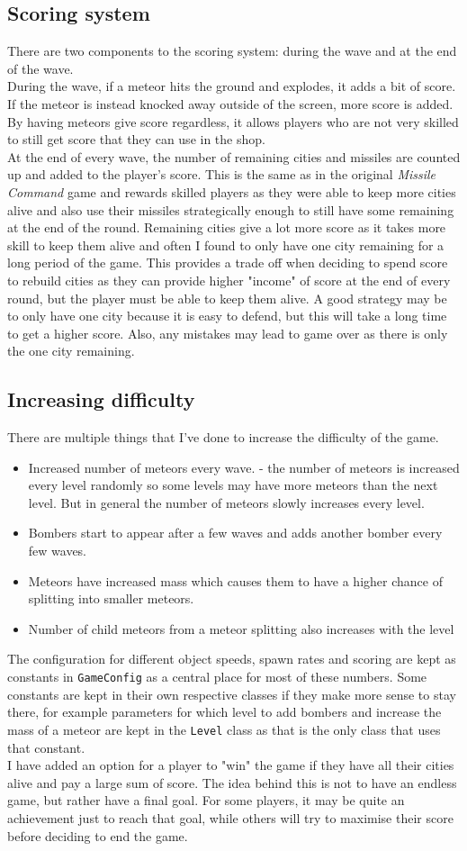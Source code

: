 \documentclass{article}
\newcommand{\n}[0]{\\[\baselineskip]}
\begin{document}
\subsection{Scoring system}
There are two components to the scoring system: during the wave and at the end of the wave. \n
During the wave, if a meteor hits the ground and explodes, it adds a bit of score. If the meteor is instead knocked away outside of the screen, more score is added. By having meteors give score regardless, it allows players who are not very skilled to still get score that they can use in the shop.
\n
At the end of every wave, the number of remaining cities and missiles are counted up and added to the player's score. This is the same as in the original \textit{Missile Command} game and rewards skilled players as they were able to keep more cities alive and also use their missiles strategically enough to still have some remaining at the end of the round. Remaining cities give a lot more score as it takes more skill to keep them alive and often I found to only have one city remaining for a long period of the game. This provides a trade off when deciding to spend score to rebuild cities as they can provide higher "income" of score at the end of every round, but the player must be able to keep them alive. A good strategy may be to only have one city because it is easy to defend, but this will take a long time to get a higher score. Also, any mistakes may lead to game over as there is only the one city remaining. 
\subsection{Increasing difficulty}
There are multiple things that I've done to increase the difficulty of the game. 
\begin{itemize}
\item Increased number of meteors every wave. - the number of meteors is increased every level randomly so some levels may have more meteors than the next level. But in general the number of meteors slowly increases every level. 
\item Bombers start to appear after a few waves and adds another bomber every few waves.
\item Meteors have increased mass which causes them to have a higher chance of splitting into smaller meteors.
\item Number of child meteors from a meteor splitting also increases with the level
\end{itemize}
The configuration for different object speeds, spawn rates and scoring are kept as constants in \texttt{GameConfig} as a central place for most of these numbers. Some constants are kept in their own respective classes if they make more sense to stay there, for example parameters for which level to add bombers and increase the mass of a meteor are kept in the \texttt{Level} class as that is the only class that uses that constant.
\n
I have added an option for a player to "win" the game if they have all their cities alive and pay a large sum of score. The idea behind this is not to have an endless game, but rather have a final goal. For some players, it may be quite an achievement just to reach that goal, while others will try to maximise their score before deciding to end the game.  
\end{document}
